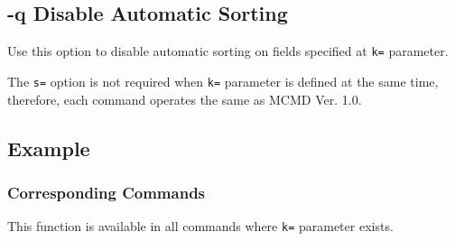 
%

\subsection{-q Disable Automatic Sorting\label{sect:option_q}}

Use this option to disable automatic sorting on fields specified at \verb|k=| parameter. 

 The \verb|s=| option is not required when \verb|k=| parameter is defined at the same time, therefore, each command operates the same as MCMD Ver. 1.0. 

\subsection*{Example}


\subsubsection*{Corresponding Commands}
This function is available in all commands where \verb|k=| parameter exists. 

%

